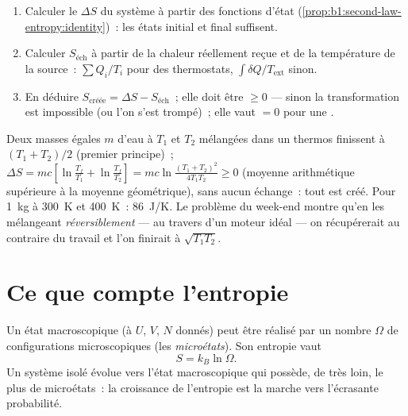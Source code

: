 \begin{method}\label{met:b1:second-law-entropy:method}
\begin{enumerate}
  \item Calculer le $\Delta S$ du système à partir des fonctions d'état
        (\cref{prop:b1:second-law-entropy:identity})~: les états initial et
        final suffisent.
  \item Calculer $S_{\text{éch}}$ à partir de la chaleur réellement reçue et
        de la température de la source~: $\sum Q_i/T_i$ pour des thermostats,
        $\int\delta Q/T_{\mathrm{ext}}$ sinon.
  \item En déduire $S_{\text{créée}} = \Delta S - S_{\text{éch}}$~; elle doit
        être $\geq 0$ --- sinon la transformation est impossible (ou l'on
        s'est trompé)~; elle vaut $= 0$ pour une .
\end{enumerate}
\end{method}

\begin{example}\label{ex:b1:second-law-entropy:mixing}
Deux masses égales $m$ d'eau à $T_1$ et $T_2$ mélangées dans un thermos finissent à
$(T_1 + T_2)/2$ (premier principe)~; $\Delta S = mc[\ln\frac{T_f}{T_1} + \ln\frac{T_f}{T_2}]
= mc\ln\frac{(T_1 + T_2)^2}{4T_1T_2} \geq 0$ (moyenne arithmétique supérieure à
la moyenne géométrique), sans aucun échange~: tout est créé. Pour \qty{1}{kg} à
\qty{300}{K} et \qty{400}{K}~: \qty{86}{J/K}. Le problème du week-end montre
qu'en les mélangeant \emph{réversiblement} --- au travers d'un moteur idéal
--- on récupérerait au contraire du travail et l'on finirait à $\sqrt{T_1T_2}$.
\end{example}

\section{Ce que compte l'entropie}

\begin{proposition}\label{prop:b1:second-law-entropy:boltzmann}
Un état macroscopique (à $U$, $V$, $N$ donnés) peut être réalisé par un
nombre $\Omega$ de configurations microscopiques (les \emph{microétats}). Son entropie vaut
\[
S = k_B\ln\Omega .
\]
Un système isolé évolue vers l'état macroscopique qui possède, de très
loin, le plus de microétats~: la croissance de l'entropie est la marche
vers l'écrasante probabilité.
\end{proposition}
\admitted

